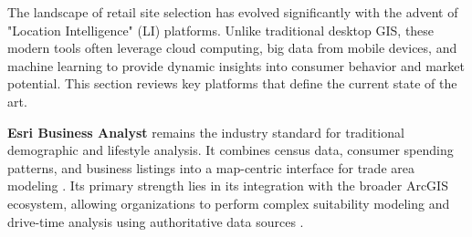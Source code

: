 \par The landscape of retail site selection has evolved significantly with the advent of "Location Intelligence" (LI) platforms. Unlike traditional desktop GIS, these modern tools often leverage cloud computing, big data from mobile devices, and machine learning to provide dynamic insights into consumer behavior and market potential. This section reviews key platforms that define the current state of the art.

\par \textbf{Esri Business Analyst} remains the industry standard for traditional demographic and lifestyle analysis. It combines census data, consumer spending patterns, and business listings into a map-centric interface for trade area modeling \citep{pick_2020}. Its primary strength lies in its integration with the broader ArcGIS ecosystem, allowing organizations to perform complex suitability modeling and drive-time analysis using authoritative data sources \citep{esri_ba_2025}.

